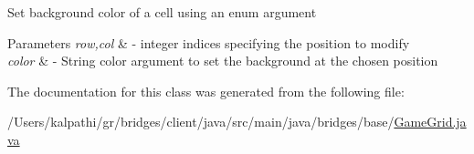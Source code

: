 Set background color of a cell using an enum argument


\begin{DoxyParams}{Parameters}
{\em row,col} & -\/ integer indices specifying the position to modify \\
\hline
{\em color} & -\/ String color argument to set the background at the chosen position \\
\hline
\end{DoxyParams}


The documentation for this class was generated from the following file\+:\begin{DoxyCompactItemize}
\item 
/\+Users/kalpathi/gr/bridges/client/java/src/main/java/bridges/base/\mbox{\hyperlink{_game_grid_8java}{Game\+Grid.\+java}}\end{DoxyCompactItemize}
